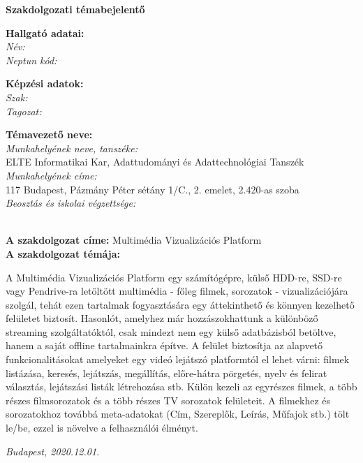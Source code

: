 
\thispagestyle{empty}
{\bf \huge {Szakdolgozati témabejelentő}}

\begin{flushleft}
    {\bf {Hallgató adatai:}}\\
    \> \> \> \> {\emph {Név: }} \authorname\\
    \> \> \> \> {\emph {Neptun kód: }} \neptuncode\\
    \vspace{0.3cm}

    {\bf {Képzési adatok:}}\\
    \> \> \> \> {\emph {Szak: }} \degreename\\
    \> \> \> \> {\emph {Tagozat: }} \studytype\\
    \vspace{0.3cm}

    {\bf {Témavezető neve:}} \supname\\
    \> \> \> \> {\emph {Munkahelyének neve, tanszéke: }}\\
    \> \> \> \> \> \> \> \> {\small {ELTE Informatikai Kar, Adattudományi és Adattechnológiai Tanszék}}\\
    \> \> \> \> {\emph {Munkahelyének címe: }}\\
    \> \> \> \> \> \> \> \> {\small {117 Budapest, Pázmány Péter sétány 1/C., 2. emelet, 2.420-as szoba}}\\
    \> \> \> \> {\emph {Beosztás és iskolai végzettsége: }} \\
    \> \> \> \> \> \> \> \> {\small \supaff}\\
\end{flushleft}

\vspace{0.5cm}

{\bf {A szakdolgozat címe:}} {Multimédia Vizualizációs Platform}\\
\vspace{1cm}
\> \> {\bf {A szakdolgozat témája:}}

A Multimédia Vizualizációs Platform egy számítógépre, külső HDD-re, SSD-re vagy Pendrive-ra letöltött multimédia - főleg filmek, sorozatok - vizualizációjára szolgál, tehát ezen tartalmak fogyasztására egy áttekinthető és könnyen kezelhető felületet biztosít. Hasonlót, amelyhez már hozzászokhattunk a különböző streaming szolgáltatóktól, csak mindezt nem egy külső adatbázisból betöltve, hanem a saját offline tartalmainkra építve. A felület biztosítja az alapvető funkcionalitásokat amelyeket egy videó lejátszó platformtól el lehet várni: filmek listázása, keresés, lejátszás, megállítás, előre-hátra pörgetés, nyelv és felirat választás, lejátszási listák létrehozása stb. Külön kezeli az egyrészes filmek, a több részes filmsorozatok és a több részes TV sorozatok felületeit. A filmekhez és sorozatokhoz továbbá meta-adatokat (Cím, Szereplők, Leírás, Műfajok stb.) tölt le/be, ezzel is növelve a felhasználói élményt.

\vfill

{\it {Budapest}, {2020.12.01.}}
